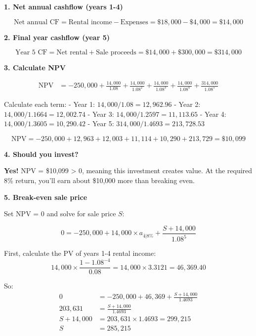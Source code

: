 \documentclass[
  letterpaper,
]{scrbook}
\begin{document}
\begin{tcolorbox}[enhanced jigsaw, toptitle=1mm, colbacktitle=quarto-callout-tip-color!10!white, opacityback=0, leftrule=.75mm, breakable, colframe=quarto-callout-tip-color-frame, toprule=.15mm, opacitybacktitle=0.6, coltitle=black, bottomrule=.15mm, colback=white, arc=.35mm, titlerule=0mm, rightrule=.15mm, left=2mm, title={Click to reveal solution}, bottomtitle=1mm]

\textbf{1. Net annual cashflow (years 1-4)}

\[
\text{Net annual CF} = \text{Rental income} - \text{Expenses} = \$18,000 - \$4,000 = \$14,000
\]

\textbf{2. Final year cashflow (year 5)}

\[
\text{Year 5 CF} = \text{Net rental} + \text{Sale proceeds} = \$14,000 + \$300,000 = \$314,000
\]

\textbf{3. Calculate NPV}

\[
\begin{aligned}
\text{NPV} &= -250,000 + \frac{14,000}{1.08} + \frac{14,000}{1.08^2} + \frac{14,000}{1.08^3} + \frac{14,000}{1.08^4} + \frac{314,000}{1.08^5}
\end{aligned}
\]

Calculate each term: - Year 1: \(14,000 / 1.08 = 12,962.96\) - Year 2:
\(14,000 / 1.1664 = 12,002.74\) - Year 3:
\(14,000 / 1.2597 = 11,113.65\) - Year 4:
\(14,000 / 1.3605 = 10,290.42\) - Year 5:
\(314,000 / 1.4693 = 213,728.53\)

\[
\text{NPV} = -250,000 + 12,963 + 12,003 + 11,114 + 10,290 + 213,729 = \$10,099
\]

\textbf{4. Should you invest?}

\textbf{Yes!} NPV = \$10,099 \textgreater{} 0, meaning this investment
creates value. At the required 8\% return, you'll earn about \$10,000
more than breaking even.

\textbf{5. Break-even sale price}

Set NPV = 0 and solve for sale price \(S\):

\[
0 = -250,000 + 14,000 \times a_{\overline{4}|8\%} + \frac{S + 14,000}{1.08^5}
\]

First, calculate the PV of years 1-4 rental income: \[
14,000 \times \frac{1 - 1.08^{-4}}{0.08} = 14,000 \times 3.3121 = 46,369.40
\]

So: \[
\begin{aligned}
0 &= -250,000 + 46,369 + \frac{S + 14,000}{1.4693} \\
203,631 &= \frac{S + 14,000}{1.4693} \\
S + 14,000 &= 203,631 \times 1.4693 = 299,215 \\
S &= 285,215
\end{aligned}
\]


\end{tcolorbox}
\end{document}
